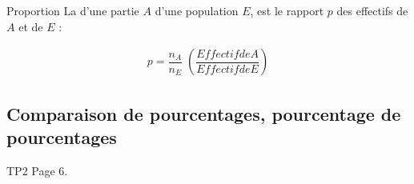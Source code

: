 \documentclass[12pt,a4paper]{article}
\begin{document}
 \begin{mybilan2}{Proportion}
		La  d'une partie $A$ d'une population $E$, est le rapport $p$ des effectifs de $A$ et de $E$ :
		
		\begin{eqnarray*}
			p = \dfrac{n_A}{n_E} \; \left(\dfrac{Effectif de A}{Effectif de E}\right)
		\end{eqnarray*}
	\end{mybilan2}

\begin{myexs}
\end{myexs}

\subsection{Comparaison de pourcentages, pourcentage de pourcentages}

TP2 Page 6.
\end{document}

